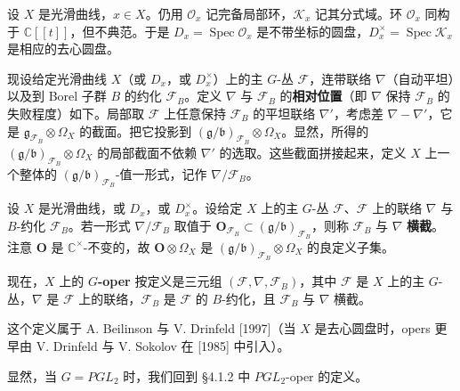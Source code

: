 设 $X$ 是光滑曲线，$x\in X$。仍用 $\mathcal{O}_x$ 记完备局部环，$\mathcal{K}_x$ 记其分式域。环 $\mathcal{O}_x$ 同构于 $\mathbb{C}[[t]]$，但不典范。于是 $D_x=\operatorname{Spec}\mathcal{O}_x$ 是不带坐标的圆盘，$D_x^\times=\operatorname{Spec}\mathcal{K}_x$ 是相应的去心圆盘。

现设给定光滑曲线 $X$（或 $D_x$，或 $D_x^\times$）上的主 $G$-丛 $\mathcal{F}$，连带联络 $\nabla$（自动平坦）以及到 Borel 子群 $B$ 的约化 $\mathcal{F}_B$。定义 $\nabla$ 与 $\mathcal{F}_B$ 的\textbf{相对位置}（即 $\nabla$ 保持 $\mathcal{F}_B$ 的失败程度）如下。局部取 $\mathcal{F}$ 上任意保持 $\mathcal{F}_B$ 的平坦联络 $\nabla'$，考虑差 $\nabla-\nabla'$，它是 $\mathfrak{g}_{\mathcal{F}_B}\otimes\Omega_X$ 的截面。把它投影到 $(\mathfrak{g}/\mathfrak{b})_{\mathcal{F}_B}\otimes\Omega_X$。显然，所得的 $(\mathfrak{g}/\mathfrak{b})_{\mathcal{F}_B}\otimes\Omega_X$ 的局部截面不依赖 $\nabla'$ 的选取。这些截面拼接起来，定义 $X$ 上一个整体的 $(\mathfrak{g}/\mathfrak{b})_{\mathcal{F}_B}$-值一形式，记作 $\nabla/\mathcal{F}_B$。

设 $X$ 是光滑曲线，或 $D_x$，或 $D_x^\times$。设给定 $X$ 上的主 $G$-丛 $\mathcal{F}$、$\mathcal{F}$ 上的联络 $\nabla$ 与 $B$-约化 $\mathcal{F}_B$。若一形式 $\nabla/\mathcal{F}_B$ 取值于 $\mathbf{O}_{\mathcal{F}_B}\subset(\mathfrak{g}/\mathfrak{b})_{\mathcal{F}_B}$，则称 $\mathcal{F}_B$ 与 $\nabla$ \textbf{横截}。注意 $\mathbf{O}$ 是 $\mathbb{C}^\times$-不变的，故 $\mathbf{O}\otimes\Omega_X$ 是 $(\mathfrak{g}/\mathfrak{b})_{\mathcal{F}_B}\otimes\Omega_X$ 的良定义子集。

现在，$X$ 上的 \textbf{$G$-oper} 按定义是三元组 $(\mathcal{F},\nabla,\mathcal{F}_B)$，其中 $\mathcal{F}$ 是 $X$ 上的主 $G$-丛，$\nabla$ 是 $\mathcal{F}$ 上的联络，$\mathcal{F}_B$ 是 $\mathcal{F}$ 的 $B$-约化，且 $\mathcal{F}_B$ 与 $\nabla$ 横截。

这个定义属于 A. Beilinson 与 V. Drinfeld [1997]（当 $X$ 是去心圆盘时，opers 更早由 V. Drinfeld 与 V. Sokolov 在 [1985] 中引入）。

显然，当 $G=PGL_2$ 时，我们回到 §4.1.2 中 $PGL_2$-oper 的定义。

